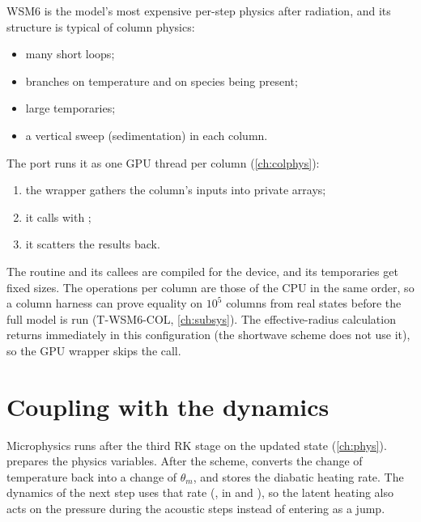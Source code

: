 \begin{portnote}
WSM6 is the model's most expensive per-step physics after radiation, and its structure is typical of column physics:
\begin{itemize}
  \item many short loops;
  \item branches on temperature and on species being present;
  \item large temporaries;
  \item a vertical sweep (sedimentation) in each column.
\end{itemize}
The port runs it as one GPU thread per column (\cref{ch:colphys}):
\begin{enumerate}
  \item the wrapper gathers the column's inputs into private arrays;
  \item it calls  with ;
  \item it scatters the results back.
\end{enumerate}
The routine and its callees are compiled for the device, and its temporaries get fixed sizes. The operations per
column are those of the CPU in the same order, so a column harness can prove equality on $10^5$ columns from real
states before the full model is run (T-WSM6-COL, \cref{ch:subsys}). The effective-radius calculation returns
immediately in this configuration (the shortwave scheme does not use it), so the GPU wrapper skips the call.
\end{portnote}

\section{Coupling with the dynamics}

Microphysics runs after the third RK stage on the updated state (\cref{ch:phys}). 
prepares the physics variables. After the scheme,  converts the change of temperature
back into a change of $\theta_m$, and stores the diabatic heating rate. The dynamics of the next step uses that rate
(, in  and ), so the latent heating also acts on the
pressure during the acoustic steps instead of entering as a jump.
